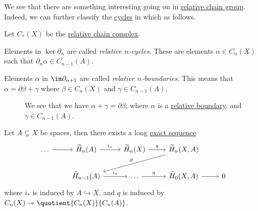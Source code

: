 We see that there are something interesting going on in \hyperref[def:relative-chain-group]{relative chain group}. Indeed, we can further classify the \hyperref[def:cycle]{cycles} in which as follows.

\begin{definition*}
	Let \(C_\ast(X)\) be the \hyperref[def:relative-chain-complex]{relative chain complex}.
	\begin{definition}\label{def:relative-cycle}
		Elements in \(\ker \partial_n\) are called \emph{relative \(n\)-cycles}. These are elements \(\alpha \in C_n(X)\) such that \(\partial_n\alpha \in C_{n - 1}(A)\).
		\begin{figure}[H]
			\centering
			\label{fig:def:relative-homology-1}
		\end{figure}
	\end{definition}
	\begin{definition}\label{def:relative-boundary}
		Elements \(\alpha\) in \(\im \partial_{n + 1}\) are called \emph{relative \(n\)-boundaries}. This means that \(\alpha = \partial \beta + \gamma\) where \(\beta \in C_n(X)\) and \(\gamma \in C_{n - 1}(A)\).
		\begin{figure}[H]
			\centering
			\caption{We see that we have \(\alpha +\gamma =\partial \beta \), where \(\alpha \) is a \hyperref[def:relative-boundary]{relative boundary},
				and \(\gamma \in C_{n-1}(A)\).}
			\label{fig:def:relative-homology-2}
		\end{figure}
	\end{definition}
\end{definition*}

\begin{theorem}\label{thm:long-exact-sequence-of-a-pair}
	Let \(A \subseteq X\) be spaces, then there exists a long \hyperref[def:exact-sequence]{exact sequence}
	\[
		\begin{tikzcd}
			{\dots} & {\widetilde{H}_n(A)} & {\widetilde{H}_n(X)} & {\widetilde{H}_n(X, A)} \\
			& {\widetilde{H}_{n-1}(A)} & \dots & {\widetilde{H}_{0}(X, A)} & 0
			\arrow[from=1-1, to=1-2]
			\arrow["{i_\ast}", from=1-2, to=1-3]
			\arrow["q", from=1-3, to=1-4]
			\arrow[from=2-4, to=2-5]
			\arrow["{q}", from=2-3, to=2-4]
			\arrow["{i_\ast}", from=2-2, to=2-3]
			\arrow["{\partial}"', from=1-4, to=2-2]
		\end{tikzcd}
	\]
	where \(i_\ast\) is induced by \(A\hookrightarrow X\), and \(q\) is induced by \(C_{n} (X)\twoheadrightarrow \quotient{C_{n} (X)}{C_{n} (A)}\).
\end{theorem}

